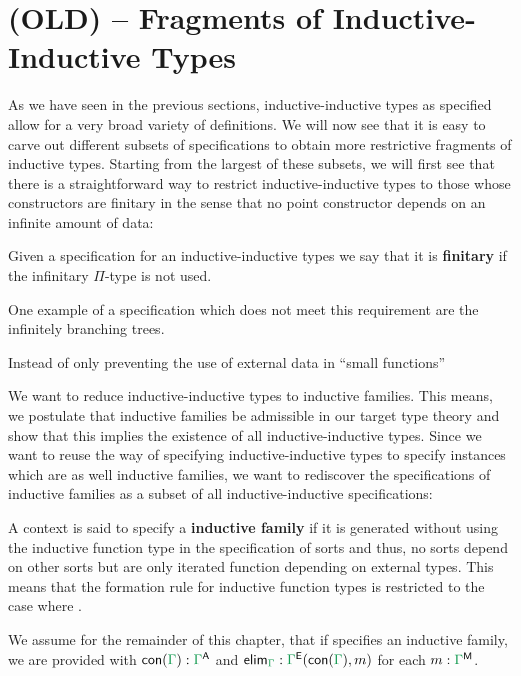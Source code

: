 \section{(OLD) -- Fragments of Inductive-Inductive Types}

As we have seen in the previous sections, inductive-inductive types as specified
allow for a very broad variety of definitions.
We will now see that it is easy to carve out different subsets of specifications
to obtain more restrictive fragments of inductive types.
Starting from the largest of these subsets, we will first see that there is a
straightforward way to restrict inductive-inductive types to those whose constructors
are finitary in the sense that no point constructor depends on an infinite
amount of data: %

\begin{defn}
Given a specification \grm{\Gamma} for an inductive-inductive types we say that
it is \textbf{finitary} if the infinitary $\Pi$-type is not used.
\end{defn}

One example of a specification which does not meet this requirement are the
infinitely branching trees. %

Instead of only preventing the use of external data in ``small functions''

We want to reduce inductive-inductive types to inductive families.
This means, we postulate that inductive families be admissible in our target
type theory and show that this implies the existence of all inductive-inductive
types.
Since we want to reuse the way of specifying inductive-inductive types to specify
instances which are as well inductive families, we want to rediscover the specifications
of inductive families as a subset of all inductive-inductive specifications:

\begin{defn}
A context \grm{\Gamma} is said to specify a \textbf{inductive family} if it is
generated without using the inductive function type in the specification of sorts
and thus, no sorts depend on other sorts but are only iterated function depending
on external types.
This means that the formation rule for inductive function types is restricted
to the case where .
\end{defn}

We assume for the remainder of this chapter, that if \grm{\Gamma} specifies an
inductive family, we are provided with $\con{\Gamma} : \grm{\Gamma}^\CC$ and
$\elim_\grm{\Gamma} : \grm{\Gamma}^\EE(\con{\Gamma}, m)$ for each
$m : \grm{\Gamma}^\MM$.

